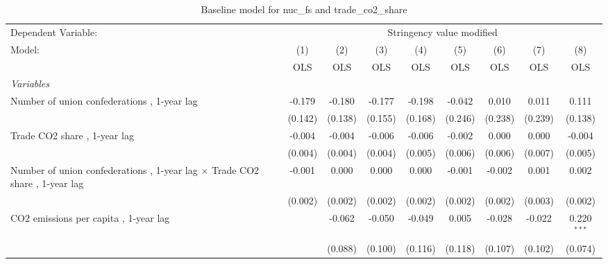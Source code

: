 
\begin{table}[htbp]
   \caption{Baseline model for nuc\_fs and trade\_co2\_share}
   \centering
   \begin{tabular}{lcccccccc}
      \toprule
      Dependent Variable: & \multicolumn{8}{c}{Stringency value modified}\\
      Model:                                                                             & (1)     & (2)     & (3)         & (4)     & (5)         & (6)          & (7)          & (8)\\  
                                                                                         &  OLS    & OLS     & OLS         & OLS     & OLS         & OLS          & OLS          & OLS\\  
      \midrule
      \emph{Variables}\\
      Number of union confederations , 1-year lag                                        & -0.179  & -0.180  & -0.177      & -0.198  & -0.042      & 0.010        & 0.011        & 0.111\\   
                                                                                         & (0.142) & (0.138) & (0.155)     & (0.168) & (0.246)     & (0.238)      & (0.239)      & (0.138)\\   
      Trade CO2 share , 1-year lag                                                       & -0.004  & -0.004  & -0.006      & -0.006  & -0.002      & 0.000        & 0.000        & -0.004\\   
                                                                                         & (0.004) & (0.004) & (0.004)     & (0.005) & (0.006)     & (0.006)      & (0.007)      & (0.005)\\   
      Number of union confederations , 1-year lag $\times$ Trade CO2 share , 1-year lag  & -0.001  & 0.000   & 0.000       & 0.000   & -0.001      & -0.002       & 0.001        & 0.002\\   
                                                                                         & (0.002) & (0.002) & (0.002)     & (0.002) & (0.002)     & (0.002)      & (0.003)      & (0.002)\\   
      CO2 emissions per capita , 1-year lag                                              &         & -0.062  & -0.050      & -0.049  & 0.005       & -0.028       & -0.022       & 0.220$^{***}$\\   
                                                                                         &         & (0.088) & (0.100)     & (0.116) & (0.118)     & (0.107)      & (0.102)      & (0.074)\\   

\end{tabular}
\end{table}
